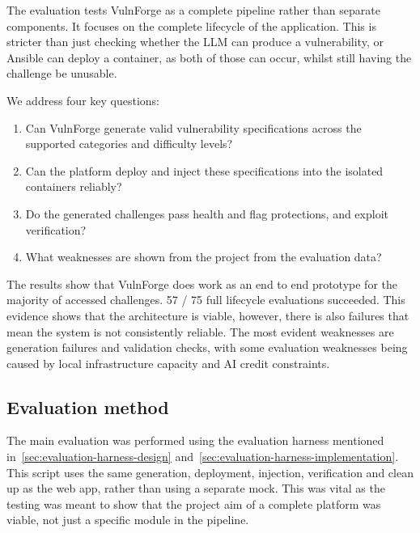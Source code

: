 %

The evaluation tests VulnForge as a complete pipeline rather than separate components. It focuses on the complete lifecycle of the application. This is stricter than just checking whether the LLM can produce a vulnerability, or Ansible can deploy a container, as both of those can occur, whilst still having the challenge be unusable.

We address four key questions:
\begin{enumerate}
	\item Can VulnForge generate valid vulnerability specifications across the supported categories and difficulty levels?
	\item Can the platform deploy and inject these specifications into the isolated containers reliably?
	\item Do the generated challenges pass health and flag protections, and exploit verification?
	\item What weaknesses are shown from the project from the evaluation data?
\end{enumerate}

The results show that VulnForge does work as an end to end prototype for the majority of accessed challenges. 57 / 75 full lifecycle evaluations succeeded. This evidence shows that the architecture is viable, however, there is also failures that mean the system is not consistently reliable. The most evident weaknesses are generation failures and validation checks, with some evaluation weaknesses being caused by local infrastructure capacity and AI credit constraints.

\subsection{Evaluation method}\label{sec:eval-method}

The main evaluation was performed using the evaluation harness mentioned in~\ref{sec:evaluation-harness-design} and~\ref{sec:evaluation-harness-implementation}. This script uses the same generation, deployment, injection, verification and clean up as the web app, rather than using a separate mock. This was vital as the testing was meant to show that the project aim of a complete platform was viable, not just a specific module in the pipeline.

